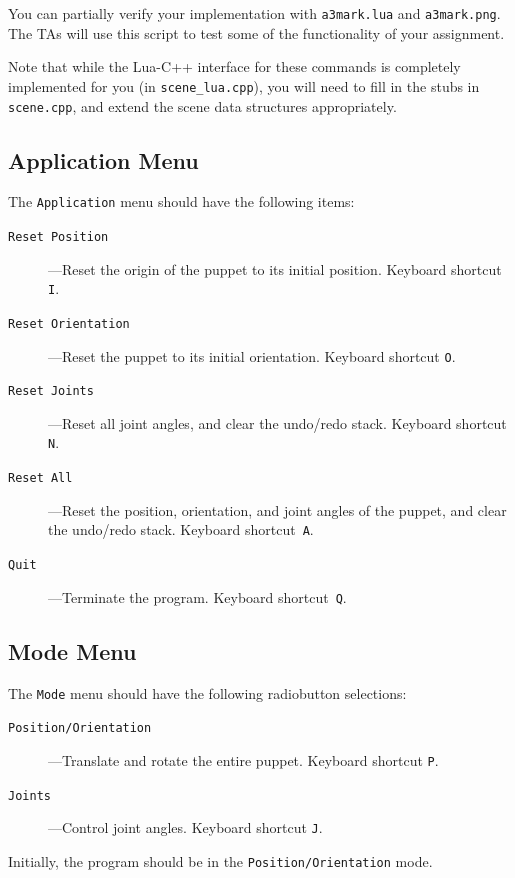 You can partially verify your implementation with \texttt{a3mark.lua}
and \texttt{a3mark.png}.  The TAs will use this script to test some of 
the functionality of your assignment.

Note that while the Lua-C++ interface for these commands is
completely implemented for you (in \texttt{scene\_lua.cpp}), you will
need to fill in the stubs in \texttt{scene.cpp}, and extend the scene
data structures appropriately.

\subsection{Application Menu}
The {\tt Application} menu should have the following items:
\begin{description}
	\item[{\tt Reset Position}]---Reset the origin of the puppet to its 
		initial position.  Keyboard shortcut  \texttt{I}.
	\item[{\tt Reset Orientation}]---Reset 
		the puppet to its initial orientation.
		Keyboard shortcut  \texttt{O}.
	\item[{\tt Reset Joints}]---Reset all joint angles, and clear the
		undo/redo stack.
		Keyboard shortcut  \texttt{N}.
	\item[{\tt Reset All}]---Reset the position, orientation, and 
	 	joint angles of the puppet, and clear the undo/redo
		stack.
		Keyboard shortcut~\texttt{A}.
	\item[{\tt Quit}]---Terminate the program.
		Keyboard shortcut~\texttt{Q}.
\end{description}

\subsection{Mode Menu}
The {\tt Mode} menu should have the following radiobutton selections:
\begin{description}
	\item[{\tt Position/Orientation}]---Translate and
		rotate the entire puppet.
		Keyboard shortcut  \texttt{P}.
	\item[{\tt Joints}]---Control joint angles.
		Keyboard shortcut  \texttt{J}.
\end{description}
Initially, the program should be in the {\tt Position/Orientation} 
mode.  

